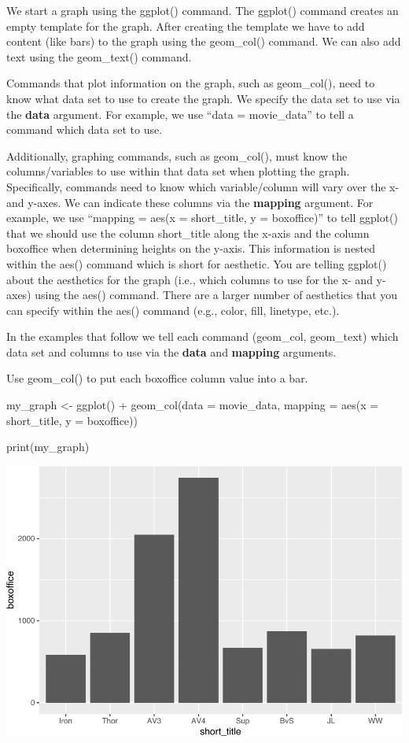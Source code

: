 \documentclass[
]{krantz}
\makeatletter
\newenvironment{Shaded}{\begin{snugshade}}{\end{snugshade}}
\newcommand{\AttributeTok}[1]{\textcolor[rgb]{0.61,0.61,0.61}{#1}}
\newcommand{\FunctionTok}[1]{\textcolor[rgb]{0,0,0}{#1}}
\newcommand{\NormalTok}[1]{#1}
\newcommand{\OtherTok}[1]{\textcolor[rgb]{0.37,0.37,0.37}{#1}}
\newcommand{\SpecialCharTok}[1]{\textcolor[rgb]{0,0,0}{#1}}
\newenvironment{kframe}{%
\medskip{}
\setlength{\fboxsep}{.8em}
 \def\at@end@of@kframe{}%
 \ifinner\ifhmode%
  \def\at@end@of@kframe{\end{minipage}}%
  \begin{minipage}{\columnwidth}%
 \fi\fi%
 \def\FrameCommand##1{\hskip\@totalleftmargin \hskip-\fboxsep
 \colorbox{shadecolor}{##1}\hskip-\fboxsep
     \hskip-\linewidth \hskip-\@totalleftmargin \hskip\columnwidth}%
 \MakeFramed {\advance\hsize-\width
   \@totalleftmargin\z@ \linewidth\hsize
   \@setminipage}}%
 {\par\unskip\endMakeFramed%
 \at@end@of@kframe}
\renewenvironment{Shaded}{\begin{kframe}}{\end{kframe}}
\makeatother
\begin{document}
We start a graph using the ggplot() command. The ggplot() command creates an empty template for the graph. After creating the template we have to add content (like bars) to the graph using the geom\_col() command. We can also add text using the geom\_text() command.

Commands that plot information on the graph, such as geom\_col(), need to know what data set to use to create the graph. We specify the data set to use via the \textbf{data} argument. For example, we use ``data = movie\_data'' to tell a command which data set to use.

Additionally, graphing commands, such as geom\_col(), must know the columns/variables to use within that data set when plotting the graph. Specifically, commands need to know which variable/column will vary over the x- and y-axes. We can indicate these columns via the \textbf{mapping} argument. For example, we use ``mapping = aes(x = short\_title, y = boxoffice)'' to tell ggplot() that we should use the column short\_title along the x-axis and the column boxoffice when determining heights on the y-axis. This information is nested within the aes() command which is short for aesthetic. You are telling ggplot() about the aesthetics for the graph (i.e., which columns to use for the x- and y-axes) using the aes() command. There are a larger number of aesthetics that you can specify within the aes() command (e.g., color, fill, linetype, etc.).

In the examples that follow we tell each command (geom\_col, geom\_text) which data set and columns to use via the \textbf{data} and \textbf{mapping} arguments.

Use geom\_col() to put each boxoffice column value into a bar.

\begin{Shaded}
\begin{Highlighting}[]
\NormalTok{my\_graph }\OtherTok{\textless{}{-}} \FunctionTok{ggplot}\NormalTok{() }\SpecialCharTok{+}
  \FunctionTok{geom\_col}\NormalTok{(}\AttributeTok{data =}\NormalTok{ movie\_data,}
           \AttributeTok{mapping =} \FunctionTok{aes}\NormalTok{(}\AttributeTok{x =}\NormalTok{ short\_title, }
                         \AttributeTok{y =}\NormalTok{ boxoffice))}

\FunctionTok{print}\NormalTok{(my\_graph)}
\end{Highlighting}
\end{Shaded}

\includegraphics[width=0.65\linewidth]{bookdown_files/figure-latex/unnamed-chunk-109-1}
\end{document}
